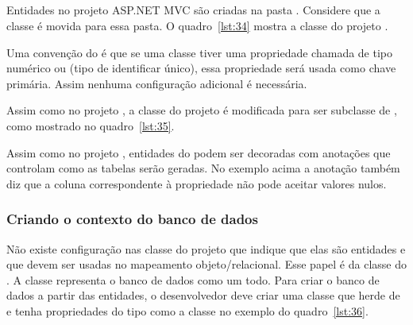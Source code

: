 \subsection{}

Entidades no projeto ASP.NET MVC são criadas na pasta . Considere que a classe  é movida para essa pasta. O quadro~\ref{lst:34} mostra a classe  do projeto .


Uma convenção do  é que se uma classe tiver uma propriedade chamada  de tipo numérico ou  (tipo de identificar único), essa propriedade será usada como chave primária. Assim nenhuma configuração adicional é necessária.

Assim como no projeto , a classe  do projeto  é modificada para ser subclasse de , como mostrado no quadro~\ref{lst:35}.


Assim como no projeto , entidades do  podem ser decoradas com anotações que controlam como as tabelas serão geradas. No exemplo acima a anotação  também diz que a coluna correspondente à propriedade  não pode aceitar valores nulos.

\subsubsection{Criando o contexto do banco de dados}

Não existe configuração nas classe do projeto  que indique que elas são entidades e que devem ser usadas no mapeamento objeto/relacional. Esse papel é da classe  do . A classe  representa o banco de dados como um todo. Para criar o banco de dados a partir das entidades, o desenvolvedor deve criar uma classe que herde de  e tenha propriedades do tipo  como a classe  no exemplo do quadro~\ref{lst:36}. 



